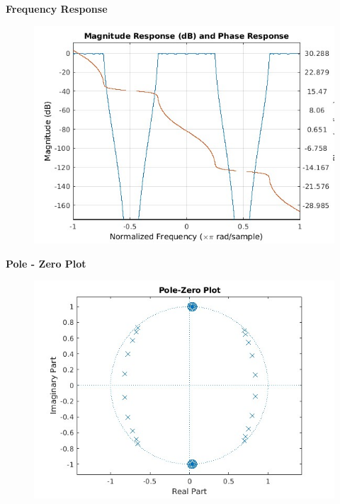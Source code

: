 \documentclass{article}
\begin{document}
\textbf{Frequency Response}
\begin{figure}[H]
\hspace*{-2.5cm}
    \centering
    \includegraphics[scale = 0.5]{bsf_cheby_magphase.jpg}
    \label{fig:my_label}
\end{figure}

\textbf{Pole - Zero Plot}
\begin{figure}[H]
\hspace*{-2.5cm}
    \centering
    \includegraphics[scale = 0.5]{polezero_bsf.jpg}
    \label{fig:my_label}
\end{figure}
\end{document}
